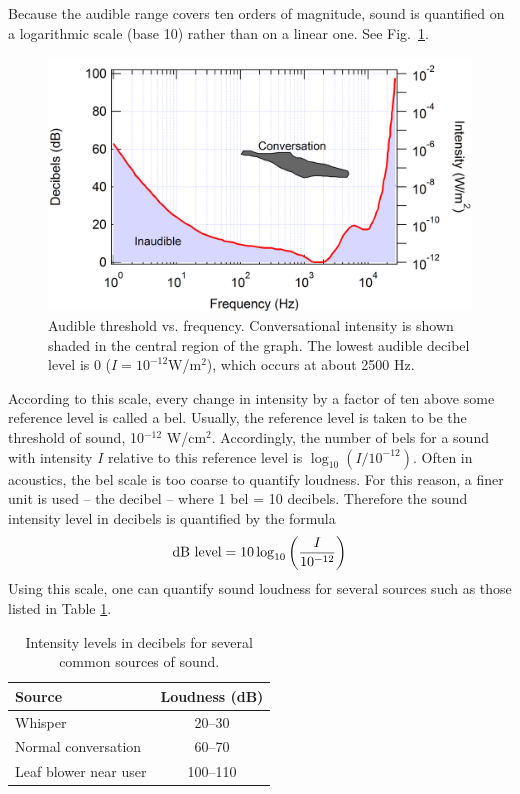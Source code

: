 Because the audible range covers ten orders of magnitude, sound is quantified on a logarithmic scale (base 10) rather than on a linear one. See Fig.~\ref{decibels}.
\begin{figure}[htb]
	\centering
	\includegraphics[width=4.5in]{./figures/Topic3/Fig3-decibels.png}
	\caption{Audible threshold vs. frequency. Conversational intensity is shown shaded in the central region of the graph. The lowest audible decibel level is 0 ($I=10^{-12}$W/m$^2$), which occurs at about 2500 Hz.}
	\label{decibels}
\end{figure}
According to this scale, every change in intensity by a factor of ten above some reference level is called a bel.  Usually, the reference level is taken to be the threshold of sound, 10$^{-12}$ W/cm$^2$.  Accordingly, the number of bels for a sound with intensity $I$ relative to this reference level is $\log_{10}\left(I/10^{-12}\right)$.  Often in acoustics, the bel scale is too coarse to quantify loudness.  For this reason, a finer unit is used -- the decibel -- where 1 bel = 10 decibels.  Therefore the sound intensity level in decibels is quantified by the formula
\begin{equation}\label{eqn3-5}
{\rm dB~level} = 10 \log_{10}\left(\frac{I}{10^{-12}}\right)
\end{equation}
Using this scale, one can quantify sound loudness for several sources such as those listed in Table \ref{decibel-table}.
\begin{table}[h]
\begin{center}
\begin{tabular}{|l|c|}
\hline
Source & Loudness (dB) \\
\hline
Whisper & 20--30 \\
Normal conversation & 60--70 \\
Leaf blower near user & 100--110 \\
\hline
\end{tabular}
\caption{Intensity levels in decibels for several common sources of sound.}
\label{decibel-table}
\end{center}
\end{table}

